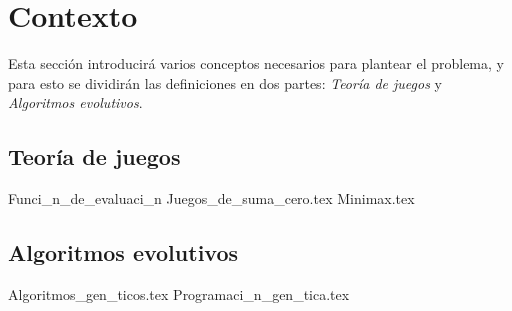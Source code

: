 \section{Contexto}
  Esta sección introducirá varios conceptos necesarios para plantear el problema, y para esto se 
  dividirán las definiciones en dos partes: \textit{Teoría de juegos} y \textit{Algoritmos 
  evolutivos}.

  \subsection{Teoría de juegos}    
    {Funci_n_de_evaluaci_n}
    {Juegos_de_suma_cero.tex}
    {Minimax.tex}

  \subsection{Algoritmos evolutivos}
    {Algoritmos_gen_ticos.tex}
    {Programaci_n_gen_tica.tex}